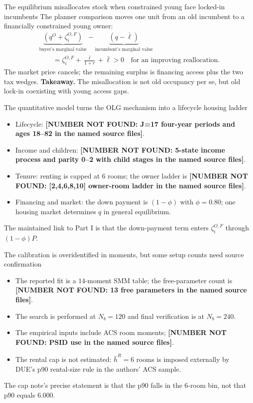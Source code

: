 \documentclass[aspectratio=169,10pt]{beamer}
\newcommand{\takeaway}[1]{\vfill{\footnotesize\textbf{Takeaway.} #1}}
\newcommand{\notfound}[1]{\textbf{[NUMBER NOT FOUND: #1]}}
\begin{document}
\begin{frame}{The equilibrium misallocates stock when constrained young face locked-in incumbents}
  The planner comparison moves one unit from an old incumbent to a financially constrained young owner:
  \[
  \begin{aligned}
  &\underbrace{\left(q^O+\zeta_i^{O,F}\right)}_{\text{buyer's marginal value}}
  -\underbrace{\left(q-\bar\ell\right)}_{\text{incumbent's marginal value}}
  \\
  &\qquad
  =
  \zeta_i^{O,F}+\frac{\bar\ell}{1+r}+\bar\ell
  >0
  \quad\text{for an improving reallocation}.
  \end{aligned}
  \]
  The market price cancels; the remaining surplus is financing access plus the two tax wedges.
  \takeaway{The misallocation is not old occupancy per se, but old lock-in coexisting with young access gaps.}
\end{frame}

\begin{frame}{The quantitative model turns the OLG mechanism into a lifecycle housing ladder}
  \begin{itemize}
    \item Lifecycle: \notfound{J=17 four-year periods and ages 18--82 in the named source files}.
    \item Income and children: \notfound{5-state income process and parity 0--2 with child stages in the named source files}.
    \item Tenure: renting is capped at $6$ rooms; the owner ladder is \notfound{[2,4,6,8,10] owner-room ladder in the named source files}.
    \item Financing and market: the down payment is $(1-\phi)$ with $\phi=0.80$; one housing market determines $q$ in general equilibrium.
  \end{itemize}
  The maintained link to Part I is that the down-payment term enters $\zeta_i^{O,F}$ through $(1-\phi)P$.
\end{frame}

\begin{frame}{The calibration is overidentified in moments, but some setup counts need source confirmation}
  \begin{itemize}
    \item The reported fit is a $14$-moment SMM table; the free-parameter count is \notfound{13 free parameters in the named source files}.
    \item The search is performed at $N_b=120$ and final verification is at $N_b=240$.
    \item The empirical inputs include ACS room moments; \notfound{PSID use in the named source files}.
    \item The rental cap is not estimated: $\bar h^R=6$ rooms is imposed externally by DUE's p90 rental-size rule in the authors' ACS sample.
  \end{itemize}
  The cap note's precise statement is that the p90 falls in the 6-room bin, not that p90 equals 6.000.
\end{frame}
\end{document}
